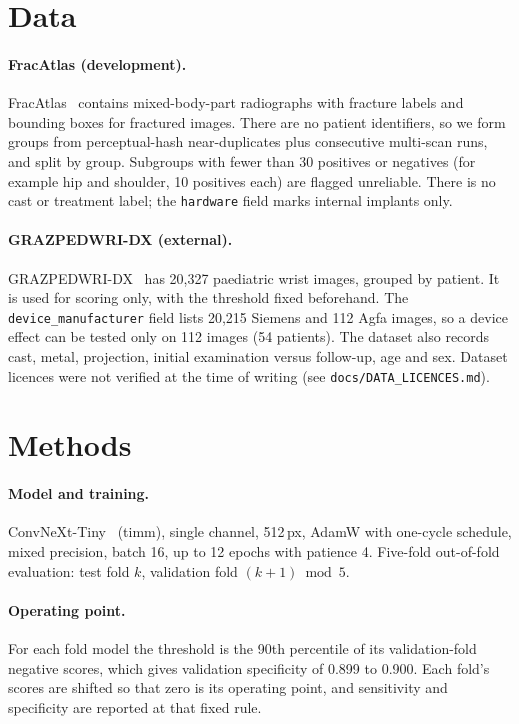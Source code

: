 \documentclass[11pt]{article}
\begin{document}
\section{Data}
\paragraph{FracAtlas (development).} FracAtlas~\cite{Abedeen_2023} contains mixed-body-part radiographs with fracture labels and bounding boxes for fractured images. There are no patient identifiers, so we form groups from perceptual-hash near-duplicates plus consecutive multi-scan runs, and split by group. Subgroups with fewer than 30 positives or negatives (for example hip and shoulder, 10 positives each) are flagged unreliable. There is no cast or treatment label; the \texttt{hardware} field marks internal implants only.
\paragraph{GRAZPEDWRI-DX (external).} GRAZPEDWRI-DX~\cite{Nagy_2022} has 20,327 paediatric wrist images, grouped by patient. It is used for scoring only, with the threshold fixed beforehand. The \texttt{device\_manufacturer} field lists 20,215 Siemens and 112 Agfa images, so a device effect can be tested only on 112 images (54 patients). The dataset also records cast, metal, projection, initial examination versus follow-up, age and sex.
Dataset licences were not verified at the time of writing (see \texttt{docs/DATA\_LICENCES.md}).

\section{Methods}
\paragraph{Model and training.} ConvNeXt-Tiny~\cite{Liu_2022} (timm), single channel, 512\,px, AdamW with one-cycle schedule, mixed precision, batch 16, up to 12 epochs with patience 4. Five-fold out-of-fold evaluation: test fold $k$, validation fold $(k+1)\bmod 5$.
\paragraph{Operating point.} For each fold model the threshold is the 90th percentile of its validation-fold negative scores, which gives validation specificity of 0.899 to 0.900. Each fold's scores are shifted so that zero is its operating point, and sensitivity and specificity are reported at that fixed rule.
\end{document}
